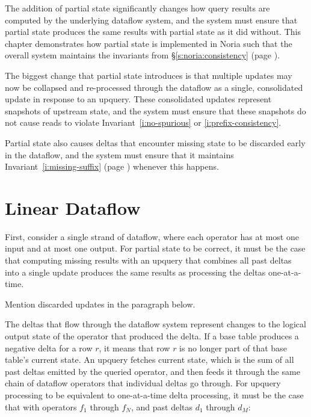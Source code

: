 The addition of partial state significantly changes how query results are
computed by the underlying dataflow system, and the system must ensure that
partial state produces the same results with partial state as it did without.
This chapter demonstrates how partial state is implemented in Noria such that
the overall system maintains the invariants from \S\ref{s:noria:consistency}
(page \pageref{i:no-spurious}).

The biggest change that partial state introduces is that multiple updates may
now be collapsed and re-processed through the dataflow as a single, consolidated
update in response to an upquery. These consolidated updates represent snapshots
of upstream state, and the system must ensure that these snapshots do not cause
reads to violate Invariant~\ref{i:no-spurious} or \ref{i:prefix-consistency}.

Partial state also causes deltas that encounter missing state to be discarded
early in the dataflow, and the system must ensure that it maintains
Invariant~\ref{i:missing-suffix} (page \pageref{i:missing-suffix}) whenever this
happens.

\section{Linear Dataflow}

First, consider a single strand of dataflow, where each operator has at most one
input and at most one output. For partial state to be correct, it must be the
case that computing missing results with an upquery that combines all past
deltas into a single update produces the same results as processing the deltas
one-at-a-time.

\begin{inprogress}
  Mention discarded updates in the paragraph below.
\end{inprogress}

The deltas that flow through the dataflow system represent changes to the
logical output state of the operator that produced the delta. If a base table
produces a negative delta for a row $r$, it means that row $r$ is no longer part
of that base table's current state. An upquery fetches current state, which is
the sum of all past deltas emitted by the queried operator, and then feeds it
through the same chain of dataflow operators that individual deltas go through.
For upquery processing to be equivalent to one-at-a-time delta processing, it
must be the case that with operators $f_1$ through $f_N$, and past deltas $d_1$
through $d_M$:

